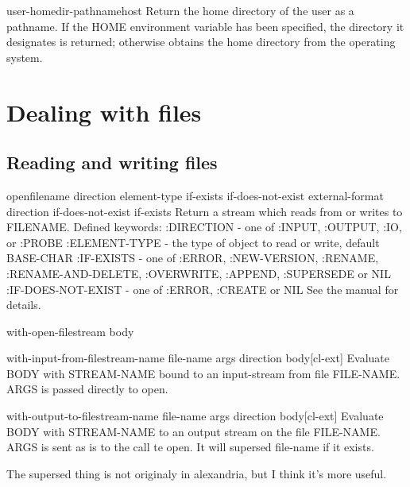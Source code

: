 \documentclass[10pt,english]{book}
\begin{document}
\begin{function}{user-homedir-pathname}{\op host}
  Return the home directory of the user as a pathname. If the HOME
environment variable has been specified, the directory it designates
is returned; otherwise obtains the home directory from the operating
system.
\end{function}

\section{Dealing with files}
\label{sec:dealing-with-files}

\subsection{Reading and writing files}
\label{sec:read-writ}

\begin{function}{open}{filename \key direction element-type if-exists if-does-not-exist
 external-format \aux direction if-does-not-exist if-exists}
  Return a stream which reads from or writes to FILENAME.
  Defined keywords:
   :DIRECTION - one of :INPUT, :OUTPUT, :IO, or :PROBE
   :ELEMENT-TYPE - the type of object to read or write, default BASE-CHAR
   :IF-EXISTS - one of :ERROR, :NEW-VERSION, :RENAME, :RENAME-AND-DELETE,
                       :OVERWRITE, :APPEND, :SUPERSEDE or NIL
   :IF-DOES-NOT-EXIST - one of :ERROR, :CREATE or NIL
  See the manual for details.
\end{function}

\begin{macro}{with-open-file}{stream \body body}
  
\end{macro}

\begin{macro}{with-input-from-file}{stream-name file-name \rest args
    \key direction \akeys \body body}[cl-ext]
  Evaluate BODY with STREAM-NAME bound to an input-stream from file
FILE-NAME. ARGS is passed directly to open.
\end{macro}

\begin{macro}{with-output-to-file}{stream-name file-name \rest args
    \key direction \akeys \body body}[cl-ext]
  Evaluate BODY with STREAM-NAME to an output stream on the file
FILE-NAME. ARGS is sent as is to the call te open. It will supersed
file-name if it exists.
\begin{devnote}
  The supersed thing is not originaly in alexandria, but I think it's
  more useful.
\end{devnote}
\end{macro}
\end{document}
